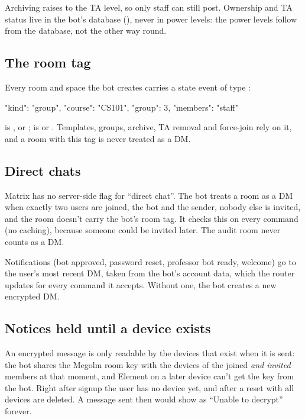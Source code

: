 Archiving raises  to the TA level, so only staff can still post.
Ownership and TA status live in the bot's database (), never in power
levels: the power levels follow from the database, not the other way round.

\subsection{The room tag}

Every room and space the bot creates carries a state event of type
:

\begin{codefile}
{"kind": "group", "course": "CS101", "group": 3, "members": "staff"}
\end{codefile}

 is ,  or ;  is  or
. Templates, groups, archive, TA removal and force-join rely on it, and a room with
this tag is never treated as a DM.

\subsection{Direct chats}
\label{sec:dm-rule}

Matrix has no server-side flag for \enquote{direct chat}. The bot treats a room as a DM when
exactly two users are joined, the bot and the sender, nobody else is invited, and the room
doesn't carry the bot's room tag. It checks this on every command (no caching), because
someone could be invited later. The audit room never counts as a DM.

Notifications (bot approved, password reset, professor bot ready, welcome) go to the user's
most recent DM, taken from the bot's  account data, which the router updates
for every command it accepts. Without one, the bot creates a new encrypted DM.

\subsection{Notices held until a device exists}
\label{sec:notices}

An encrypted message is only readable by the devices that exist when it is sent: the bot
shares the Megolm room key with the devices of the joined \emph{and invited} members at that
moment, and Element on a later device can't get the key from the bot. Right after signup the
user has no device yet, and after a reset with  all devices are
deleted. A message sent then would show as \enquote{Unable to decrypt} forever.

